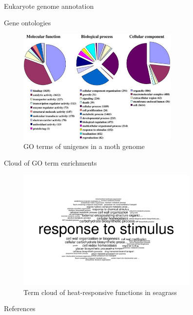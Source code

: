 \documentclass[presentation]{beamer}
\begin{document}
\begin{frame}[label=sec-4-1-6]{Eukaryote genome annotation}
\begin{center}
\begin{figure}[htb]
\begin{tikzpicture}
\end{tikzpicture}
\end{figure}
\end{center}
\end{frame}
\begin{frame}[label=sec-4-1-7]{Gene ontologies}
\begin{center}

\begin{figure}[htb]
\centering
\includegraphics[width=8cm]{Jacquin-Joly-Fig1.jpg}
\caption{GO terms of unigenes in a moth genome}
\end{figure}

\tiny{\citep{Jacquin2012}}
\end{center}
\end{frame}



\begin{frame}[label=sec-4-1-8]{Cloud of GO term enrichments}
\begin{figure}[htb]
\centering
\includegraphics[width=9cm]{t3c1BPincreased.png}
\caption{Term cloud of heat-responsive functions in seagrass}
\end{figure}
\end{frame}


\begin{frame}[label=sec-4-1-9]{References}
\raggedright
\printbibliography[sorting=nty,heading=bibnumbered]
\end{frame}
\end{document}
